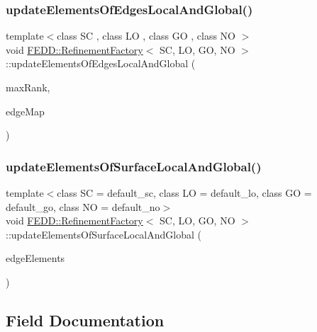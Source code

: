 \subsubsection{\texorpdfstring{update\+Elements\+Of\+Edges\+Local\+And\+Global()}{updateElementsOfEdgesLocalAndGlobal()}}
{\footnotesize\ttfamily template$<$class SC , class LO , class GO , class NO $>$ \\
void \hyperlink{classFEDD_1_1RefinementFactory}{F\+E\+D\+D\+::\+Refinement\+Factory}$<$ SC, LO, GO, NO $>$\+::update\+Elements\+Of\+Edges\+Local\+And\+Global (\begin{DoxyParamCaption}\item[{int}]{max\+Rank,  }\item[{\hyperlink{classFEDD_1_1RefinementFactory_a8256ccdf1b2a5c977ddc011f4e8eb8d3}{Map\+Const\+Ptr\+\_\+\+Type}}]{edge\+Map }\end{DoxyParamCaption})}

\mbox{\label{classFEDD_1_1RefinementFactory_a8f295b405de2c056298b695bea51887b}} 
\subsubsection{\texorpdfstring{update\+Elements\+Of\+Surface\+Local\+And\+Global()}{updateElementsOfSurfaceLocalAndGlobal()}}
{\footnotesize\ttfamily template$<$class SC = default\+\_\+sc, class LO = default\+\_\+lo, class GO = default\+\_\+go, class NO = default\+\_\+no$>$ \\
void \hyperlink{classFEDD_1_1RefinementFactory}{F\+E\+D\+D\+::\+Refinement\+Factory}$<$ SC, LO, GO, NO $>$\+::update\+Elements\+Of\+Surface\+Local\+And\+Global (\begin{DoxyParamCaption}\item[{\hyperlink{classFEDD_1_1RefinementFactory_ae5285e990ec4632d6188a1280627ad13}{Edge\+Elements\+Ptr\+\_\+\+Type}}]{edge\+Elements }\end{DoxyParamCaption})}



\subsection{Field Documentation}
\mbox{\label{classFEDD_1_1RefinementFactory_ac8f78b4bd97729d0ca0a3a36097da107}} 
